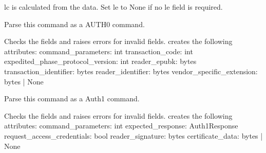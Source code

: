 \documentclass[letterpaper,10pt,english]{sphinxmanual}
\begin{document}
\begin{fulllineitems}
\begin{fulllineitems}
\sphinxAtStartPar
lc is calculated from the data.
Set le to None if no le field is required.

\end{fulllineitems}


\begin{fulllineitems}
\label{\detokenize{aliro_actuator.access_protocol.apdu:aliro_actuator.access_protocol.apdu.Command.parse_as_auth0}}
\pysigstartsignatures
{}
\pysigstopsignatures
\sphinxAtStartPar
Parse this command as a AUTH0 command.

\sphinxAtStartPar
Checks the fields and raises errors for invalid fields.
creates the following attributes:
command\_parameters: int
transaction\_code: int
expedited\_phase\_protocol\_version: int
reader\_epubk: bytes
transaction\_identifier: bytes
reader\_identifier: bytes
vendor\_specific\_extension: bytes | None

\end{fulllineitems}


\begin{fulllineitems}
\label{\detokenize{aliro_actuator.access_protocol.apdu:aliro_actuator.access_protocol.apdu.Command.parse_as_auth1}}
\pysigstartsignatures
{}
\pysigstopsignatures
\sphinxAtStartPar
Parse this command as a Auth1 command.

\sphinxAtStartPar
Checks the fields and raises errors for invalid fields.
creates the following attributes:
command\_parameters: int
expected\_response: Auth1Response
request\_access\_credentials: bool
reader\_signature: bytes
certificate\_data: bytes | None

\end{fulllineitems}



\end{fulllineitems}
\end{document}
